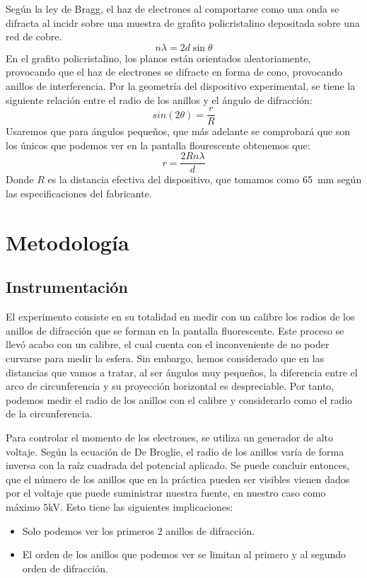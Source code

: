 \documentclass[a4paper,11pt]{article}
\begin{document}
Según la ley de Bragg, el haz de electrones al comportarse como una onda se difracta al incidr sobre una muestra
de grafito policristalino depositada sobre una red de cobre.
\begin{equation}
    n\lambda = 2d\sin\theta
    \label{eq:bragg}
\end{equation}
En el grafito policristalino, los planos están orientados aleatoriamente, provocando que el haz de electrones
se difracte en forma de cono, provocando anillos de interferencia.
Por la geometría del dispositivo experimental, se tiene la siguiente relación entre el radio de los anillos y el ángulo de difracción:
\begin{equation}
    sin(2\theta) = \frac{r}{R}
\end{equation}
Usaremos que para ángulos pequeños, que más adelante se comprobará que
son los únicos que podemos ver en la pantalla flourescente obtenemos que:
\begin{equation}
    r=\frac{2Rn\lambda}{d}
\end{equation}
Donde $R$ es la distancia efectiva del dispositivo, que tomamos como
\SI{65}{mm} según las especificaciones del fabricante.

\section{Metodología}
\subsection{Instrumentación}
El experimento consiste en su totalidad en medir con un calibre los radios de los anillos de difracción que se forman en la pantalla fluorescente.
Este proceso se llevó acabo con un calibre, el cual cuenta con el inconveniente de no poder curvarse para medir la esfera. 
Sin embargo, hemos considerado que en las distancias que vamos a tratar, al ser ángulos muy pequeños, la diferencia entre el arco de circunferencia
y su proyección horizontal es despreciable. Por tanto, podemos medir el radio de los anillos con el calibre y considerarlo como el radio de la circunferencia.

Para controlar el momento de los electrones, se utiliza un generador de alto
voltaje. Según la ecuación de De Broglie, el radio de los anillos varía de
forma inversa con la raíz cuadrada del potencial aplicado.
Se puede concluir entonces, que el número de los anillos que en la práctica pueden ser visibles vienen dados por el voltaje que puede suministrar nuestra fuente, en nuestro caso como máximo 5kV.
Esto tiene las siguientes implicaciones:
\begin{itemize}
    \item Solo podemos ver los primeros 2 anillos de difracción.
    \item El orden de los anillos que podemos ver se limitan al primero y al segundo orden de difracción.
\end{itemize}
\end{document}
